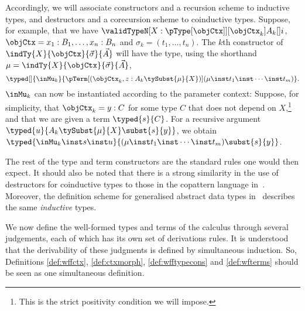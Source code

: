 \documentclass[preprint]{sigplanconf}
\begin{document}
Accordingly, we will associate constructors and a recursion scheme to inductive
types, and destructors and a
corecursion scheme to coinductive types.
Suppose, for example, that we have
$\validTypeN[X : {\pType[\objCtx]}][\objCtx_k]{A_k}[]{i}$,
$\objCtx = x_1 : B_1, \dotsc, x_n : B_n$
and $\sigma_k = (t_1, \dotsc, t_n)$.
The $k$th constructor of $\indTy{X}{\objCtx}{\vec{\sigma}}{\vec{A}}$
will have the type, using the shorthand
$\mu = \indTy{X}{\objCtx}{\vec{\sigma}}{\vec{A}}$,
\begin{equation*}
  \typed[]{\inMu_k}{
    \pTerm[\left(\objCtx_k, z : A_k \tySubst{\mu}{X} \right)]{
      \left( \mu \inst t_1 \inst \dotsb \inst t_m \right)}}.
\end{equation*}
$\inMu_k$ can now be instantiated according to the parameter context:
Suppose, for simplicity, that $\objCtx_k = y : C$ for some type $C$
that does not depend on $X$,\footnote{This is the strict positivity condition
  we will impose.} and that we are
given a term $\typed{s}{C}$.
For a recursive argument
$\typed{u}{A_k \tySubst{\mu}{X} \subst{s}{y}}$, we obtain
$\typed{\inMu_k \inst s \inst u}{
  (\mu \inst t_1 \inst \dotsb \inst t_m )\subst{s}{y}}$.


The rest of the type and term constructors are the standard rules one would
then expect.
It should also be noted that there is a strong similarity in the use
of destructors for coinductive types to those in the copattern language
in~\cite{Abel2013-Copatterns}.
Moreover, the definition scheme for generalised abstract data types
in~\cite{HamanaFiore-GADT} describes the same \emph{inductive}
types.



We now define the well-formed types and terms of the calculus through several
judgements, each of which has its own set of derivations rules.
It is understood that the derivability of these judgments is defined by
simultaneous induction.
So, Definitions \ref{def:wffctx}, \ref{def:ctxmorph}, \ref{def:wfftypecons} and
\ref{def:wfterms} should be seen as one simultaneous definition.
\end{document}
